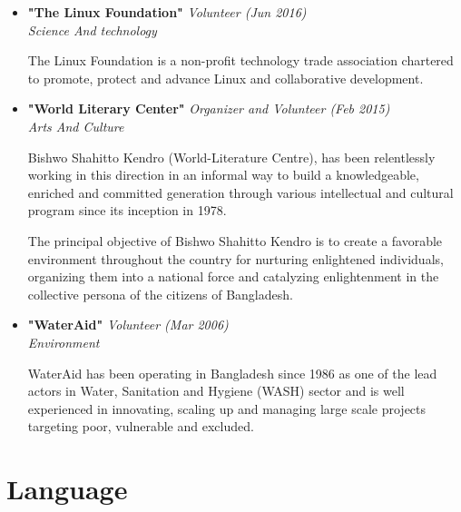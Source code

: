 \documentclass[11pt,a4paper,sans]{moderncv}        %
\begin{document}
\begin{itemize}
\vspace{6pt}

\item{\textbf{"The Linux Foundation"} \textit{Volunteer (Jun 2016) \\ Science And technology}

\vspace{3pt}

\small{The Linux Foundation is a non-profit technology trade association chartered to promote, protect and advance Linux and collaborative development.}}

\vspace{6pt}

\item{\textbf{"World Literary Center"} \textit{Organizer and Volunteer (Feb 2015)\\ Arts And Culture}

\vspace{3pt}

\small{Bishwo Shahitto Kendro (World-Literature Centre), has been relentlessly working in this direction in an informal way to build a knowledgeable, enriched and committed generation through various intellectual and cultural program since its inception in 1978. 

The principal objective of Bishwo Shahitto Kendro is to create a favorable environment throughout the country for nurturing enlightened individuals, organizing them into a national force and catalyzing enlightenment in the collective persona of the citizens of Bangladesh.}}

\vspace{6pt}

\item{\textbf{"WaterAid"} \textit{Volunteer (Mar 2006)\\ Environment}

\vspace{3pt}

\small{WaterAid has been operating in Bangladesh since 1986 as one of the lead actors in Water, Sanitation and Hygiene (WASH) sector and is well experienced in innovating, scaling up and managing large scale projects targeting poor, vulnerable and excluded.}}

\end{itemize}


\section{Language}
\end{document}
